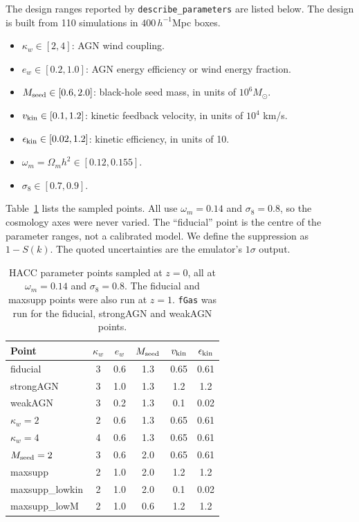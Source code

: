 \documentclass[11pt,a4paper]{article}
\begin{document}
The design ranges reported by \texttt{describe\_parameters} are listed below. The design is built from 110 simulations in $400\,h^{-1}$Mpc boxes.
\begin{itemize}
\item $\kappa_w\in[2,4]$: AGN wind coupling.
\item $e_w\in[0.2,1.0]$: AGN energy efficiency or wind energy fraction.
\item $M_{\rm seed}\in[0.6,2.0]$: black-hole seed mass, in units of $10^6M_\odot$.
\item $v_{\rm kin}\in[0.1,1.2]$: kinetic feedback velocity, in units of $10^4$ km/s.
\item $\epsilon_{\rm kin}\in[0.02,1.2]$: kinetic efficiency, in units of 10.
\item $\omega_m=\Omega_mh^2\in[0.12,0.155]$.
\item $\sigma_8\in[0.7,0.9]$.
\end{itemize}

Table~\ref{tab:points} lists the sampled points. All use $\omega_m=0.14$ and $\sigma_8=0.8$, so the cosmology axes were never varied. The ``fiducial'' point is the centre of the parameter ranges, not a calibrated model. We define the suppression as $1-S(k)$. The quoted uncertainties are the emulator's $1\sigma$ output.

\begin{table}
\centering
\begin{tabular}{lccccc}
\toprule
Point & $\kappa_w$ & $e_w$ & $M_{\rm seed}$ & $v_{\rm kin}$ & $\epsilon_{\rm kin}$\\
\midrule
fiducial & 3 & 0.6 & 1.3 & 0.65 & 0.61\\
strongAGN & 3 & 1.0 & 1.3 & 1.2 & 1.2\\
weakAGN & 3 & 0.2 & 1.3 & 0.1 & 0.02\\
$\kappa_w=2$ & 2 & 0.6 & 1.3 & 0.65 & 0.61\\
$\kappa_w=4$ & 4 & 0.6 & 1.3 & 0.65 & 0.61\\
$M_{\rm seed}=2$ & 3 & 0.6 & 2.0 & 0.65 & 0.61\\
maxsupp & 2 & 1.0 & 2.0 & 1.2 & 1.2\\
maxsupp\_lowkin & 2 & 1.0 & 2.0 & 0.1 & 0.02\\
maxsupp\_lowM & 2 & 1.0 & 0.6 & 1.2 & 1.2\\
\bottomrule
\end{tabular}
\caption{HACC parameter points sampled at $z=0$, all at $\omega_m=0.14$ and $\sigma_8=0.8$. The fiducial and maxsupp points were also run at $z=1$. \texttt{fGas} was run for the fiducial, strongAGN and weakAGN points.}
\label{tab:points}
\end{table}
\end{document}

